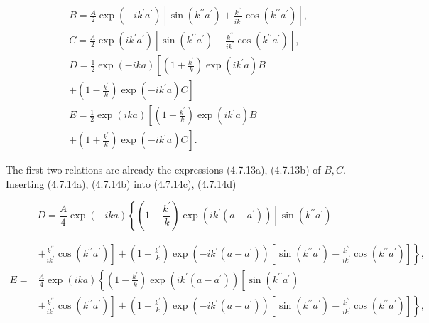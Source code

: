\documentclass{article}
\begin{document}
\begin{align*}
& B=\frac{A}{2} \exp \left(-i k^{\prime} a^{\prime}\right)\left[\sin \left(k^{\prime \prime} a^{\prime}\right)+\frac{k^{\prime \prime}}{i k^{\prime}} \cos \left(k^{\prime \prime} a^{\prime}\right)\right],  \tag{4.7.14a}\\
& C=\frac{A}{2} \exp \left(i k^{\prime} a^{\prime}\right)\left[\sin \left(k^{\prime \prime} a^{\prime}\right)-\frac{k^{\prime \prime}}{i k^{\prime}} \cos \left(k^{\prime \prime} a^{\prime}\right)\right],  \tag{4.7.14b}\\
& D=\frac{1}{2} \exp (-i k a)\left[\left(1+\frac{k^{\prime}}{k}\right) \exp \left(i k^{\prime} a\right) B\right.  \tag{4.7.14c}\\
& \left.+\left(1-\frac{k^{\prime}}{k}\right) \exp \left(-i k^{\prime} a\right) C\right] \\
& E=\frac{1}{2} \exp (i k a)\left[\left(1-\frac{k^{\prime}}{k}\right) \exp \left(i k^{\prime} a\right) B\right.  \tag{4.7.14d}\\
& \left.+\left(1+\frac{k^{\prime}}{k}\right) \exp \left(-i k^{\prime} a\right) C\right] .
\end{align*}
 

The first two relations are already the expressions (4.7.13a), (4.7.13b) of $B, C$. Inserting (4.7.14a), (4.7.14b) into (4.7.14c), (4.7.14d)
 
\begin{equation*}
D=\frac{A}{4} \exp (-i k a)\left\{( 1 + \frac { k ^ { \prime } } { k } ) \operatorname { e x p } ( i k ^ { \prime } ( a - a ^ { \prime } ) ) \left[\sin \left(k^{\prime \prime} a^{\prime}\right)\right.\right. \tag{4.7.15a}
\end{equation*}
 
 
\begin{align*}
& \left.\left.+\frac{k^{\prime \prime}}{i k^{\prime}} \cos \left(k^{\prime \prime} a^{\prime}\right)\right]+\left(1-\frac{k^{\prime}}{k}\right) \exp \left(-i k^{\prime}\left(a-a^{\prime}\right)\right)\left[\sin \left(k^{\prime \prime} a^{\prime}\right)-\frac{k^{\prime \prime}}{i k^{\prime}} \cos \left(k^{\prime \prime} a^{\prime}\right)\right]\right\}, \\
E= & \frac{A}{4} \exp (i k a)\left\{( 1 - \frac { k ^ { \prime } } { k } ) \operatorname { e x p } ( i k ^ { \prime } ( a - a ^ { \prime } ) ) \left[\sin \left(k^{\prime \prime} a^{\prime}\right)\right.\right.  \tag{4.7.15b}\\
& \left.\left.+\frac{k^{\prime \prime}}{i k^{\prime}} \cos \left(k^{\prime \prime} a^{\prime}\right)\right]+\left(1+\frac{k^{\prime}}{k}\right) \exp \left(-i k^{\prime}\left(a-a^{\prime}\right)\right)\left[\sin \left(k^{\prime \prime} a^{\prime}\right)-\frac{k^{\prime \prime}}{i k^{\prime}} \cos \left(k^{\prime \prime} a^{\prime}\right)\right]\right\},
\end{align*}
 
\end{document}
